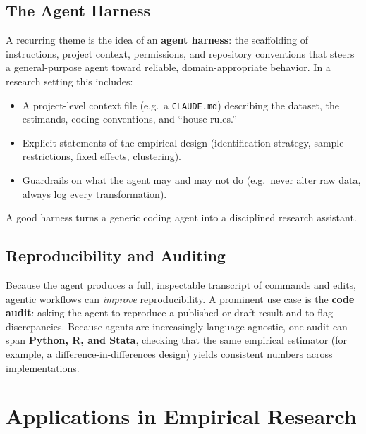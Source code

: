 \documentclass[11pt]{article}
\begin{document}
\subsection{The Agent Harness}
A recurring theme is the idea of an \textbf{agent harness}: the scaffolding
of instructions, project context, permissions, and repository conventions
that steers a general-purpose agent toward reliable, domain-appropriate
behavior. In a research setting this includes:
\begin{itemize}[leftmargin=1.4em]
  \item A project-level context file (e.g.\ a \texttt{CLAUDE.md}) describing
        the dataset, the estimands, coding conventions, and ``house rules.''
  \item Explicit statements of the empirical design (identification
        strategy, sample restrictions, fixed effects, clustering).
  \item Guardrails on what the agent may and may not do (e.g.\ never alter
        raw data, always log every transformation).
\end{itemize}
A good harness turns a generic coding agent into a disciplined research
assistant.

\subsection{Reproducibility and Auditing}
Because the agent produces a full, inspectable transcript of commands and
edits, agentic workflows can \emph{improve} reproducibility. A prominent
use case is the \textbf{code audit}: asking the agent to reproduce a
published or draft result and to flag discrepancies. Because agents are
increasingly language-agnostic, one audit can span \textbf{Python, R, and
Stata}, checking that the same empirical estimator (for example, a
difference-in-differences design) yields consistent numbers across
implementations.

\section{Applications in Empirical Research}
\end{document}
